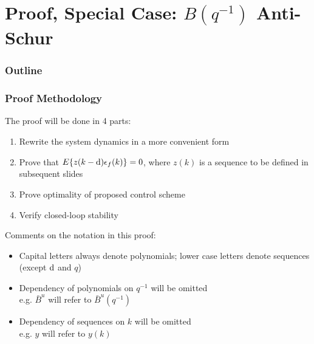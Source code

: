 \section{Proof, Special Case: $B(q^{-1})$ Anti-Schur}
\begin{frame}
    \frametitle{Outline}
    \tableofcontents[currentsection]
\end{frame}

\begin{frame}
    \frametitle{Proof Methodology}

    The proof will be done in 4 parts:

    \begin{enumerate}
        \item
        Rewrite the system dynamics in a more convenient form
        \pause

        \item
        Prove that $E\{z(k-\textrm{d}) \epsilon_f(k)\} = 0$, where $z(k)$ is a sequence to be defined in subsequent slides
        \pause

        \item
        Prove optimality of proposed control scheme
        \pause

        \item
        Verify closed-loop stability

    \end{enumerate}
    \pause

    Comments on the notation in this proof:
    \begin{itemize}
        \item
        Capital letters always denote polynomials; lower case letters denote sequences (except $\textrm{d}$ and $q$)

        \item
        Dependency of polynomials on $q^{-1}$ will be omitted\\
        e.g. $\bar{B}^u$ will refer to $\bar{B}^u(q^{-1})$

        \item
        Dependency of sequences on $k$ will be omitted\\
        e.g. $y$ will refer to $y(k)$

    \end{itemize}
\end{frame}

